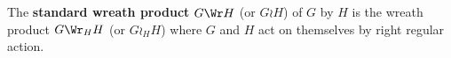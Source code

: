 \begin{definition}
	The \textbf{standard wreath product} $G\Wr H$ (or $G\wr H$) of $G$ by $H$ is the wreath product $G\Wr_H H$ (or $G\wr_H H$) where $G$ and $H$ act on themselves by right regular action.
\end{definition}
\begin{comment}
	
\begin{proposition}
	There are basic properties of wreath products.
	\begin{enumerate}[(i)]
		\item If $K$ is a subgroup of $H$, then $G\Wr_\Delta K$ (resp. $G\wr_\Delta K$) is a subgroup of $G\Wr_\Delta H$ (resp. $G\wr_\Delta H$).
		\item Let $\{\Delta_{\lambda}\,|\,\lambda\in\Lambda\}$ be the set of orbits of $H$ on $\Delta$. For $y\in \Delta$, let $G_y = \{(a,y)\,|\, a\in G\}$. For every $\lambda\in \Lambda$, choose a representative $y_\lambda\in \Delta_\lambda$.  Then $G\wr_\Delta H = \langle G_{y_\lambda},H\,|\, \lambda\in \Lambda\rangle$. In particular, if $H$ acts transitively on $\Delta$, then for each $y\in \Delta$, we have $G\wr_\Delta H = \langle G_y ,H\rangle$.
	\end{enumerate}
\end{proposition}


\begin{proposition}
	If $\Omega$ and $\Delta$ are transitive, then the nontrivial wreath product of $G$ by $H$ is imprimitive.
\end{proposition}
\end{comment}

